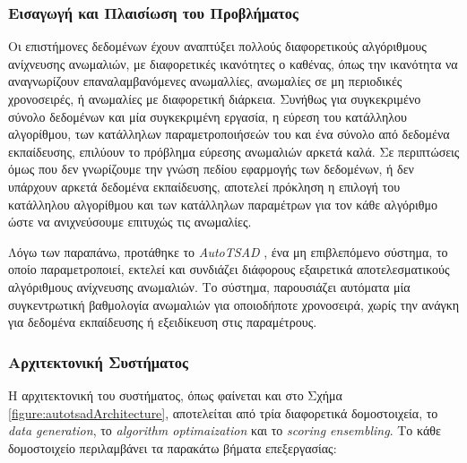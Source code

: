 \subsubsection{Εισαγωγή και Πλαισίωση του Προβλήματος}
Οι επιστήμονες δεδομένων έχουν αναπτύξει πολλούς διαφορετικούς αλγόριθμους ανίχνευσης ανωμαλιών, με διαφορετικές ικανότητες ο καθένας, όπως την ικανότητα να αναγνωρίζουν επαναλαμβανόμενες ανωμαλλίες, ανωμαλίες σε μη περιοδικές χρονοσειρές, ή ανωμαλίες με διαφορετική διάρκεια. Συνήθως για συγκεκριμένο σύνολο δεδομένων και μία συγκεκριμένη εργασία, η εύρεση του κατάλληλου αλγορίθμου, των κατάλληλων παραμετροποιήσεών του και ένα σύνολο από δεδομένα εκπαίδευσης, επιλύουν το πρόβλημα εύρεσης ανωμαλιών αρκετά καλά. Σε περιπτώσεις όμως που δεν γνωρίζουμε την γνώση πεδίου εφαρμογής των δεδομένων, ή δεν υπάρχουν αρκετά δεδομένα εκπαίδευσης, αποτελεί πρόκληση η επιλογή του κατάλληλου αλγορίθμου και των κατάλληλων παραμέτρων για τον κάθε αλγόριθμο ώστε να ανιχνεύσουμε επιτυχώς τις ανωμαλίες.

Λόγω των παραπάνω, προτάθηκε το \emph{AutoTSAD} \cite{schmidl2024autotsad}, ένα μη επιβλεπόμενο σύστημα, το οποίο παραμετροποιεί, εκτελεί και συνδιάζει διάφορους εξαιρετικά αποτελεσματικούς αλγόριθμους ανίχνευσης ανωμαλιών. Το σύστημα, παρουσιάζει αυτόματα μία συγκεντρωτική βαθμολογία ανωμαλιών για οποιοδήποτε χρονοσειρά, χωρίς την ανάγκη για δεδομένα εκπαίδευσης ή εξειδίκευση στις παραμέτρους.

\subsubsection{Αρχιτεκτονική Συστήματος}
Η αρχιτεκτονική του συστήματος, όπως φαίνεται και στο Σχήμα \ref{figure:autotsadArchitecture}, αποτελείται από τρία διαφορετικά δομοστοιχεία, το \emph{data generation}, το \emph{algorithm optimaization} και το \emph{scoring ensembling}. Το κάθε δομοστοιχείο περιλαμβάνει τα παρακάτω βήματα επεξεργασίας:

